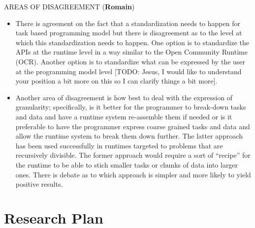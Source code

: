 AREAS OF DISAGREEMENT (\textbf{Romain})
          \begin{itemize}
            \item{
                There is agreement on the fact that a standardization
needs to happen for task based programming model but there is
disagreement as to the level at which this standardization needs to
happen. One option is to standardize the APIs at the runtime level in
a way similar to the Open Community Runtime (OCR). Another option is
to standardize what can be expressed by the user at the programming
model level [TODO: Jesus, I would like to understand your position a
bit more on this so I can clarify things a bit more].
              }
            \item{
                Another area of disagreement is how best to deal with
 the expression of granularity; specifically, is it better for the
 programmer to break-down tasks and data and have a runtime system
 re-assemble them if needed or is it preferable to have the programmer
express coarse grained tasks and data and allow the runtime system to
break them down further. The latter approach has been used
successfully in runtimes targeted to problems that are recursively
divisible. The former approach would require a sort of ``recipe'' for
the runtime to be able to stich smaller tasks or chunks of data into
larger ones. There is debate as to which approach is simpler and more
likely to yield positive results.
              }
            \end{itemize}




\section{Research Plan}


